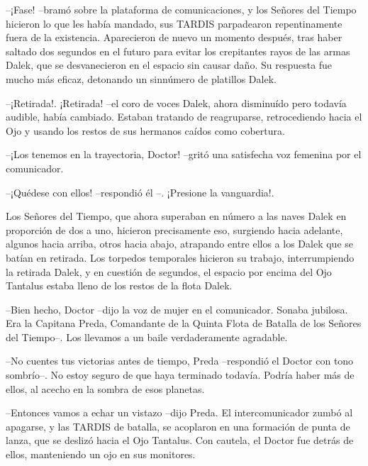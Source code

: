 --¡Fase! --bramó sobre la plataforma de comunicaciones, y los Señores del Tiempo hicieron lo que les había mandado, sus TARDIS parpadearon repentinamente fuera de la existencia. Aparecieron de nuevo un momento después, tras haber saltado dos segundos en el futuro para evitar los crepitantes rayos de las armas Dalek, que se desvanecieron en el espacio sin causar daño.
Su respuesta fue mucho más eficaz, detonando un sinnúmero de platillos Dalek.

--¡Retirada!. ¡Retirada! --el coro de voces Dalek, ahora disminuído pero todavía audible, había cambiado. Estaban tratando de reagruparse, retrocediendo hacia el Ojo y usando los restos de sus hermanos caídos como cobertura.

--¡Los tenemos en la trayectoria, Doctor! --gritó una satisfecha voz femenina por el comunicador.

--¡Quédese con ellos! --respondió él --. ¡Presione la vanguardia!.

Los Señores del Tiempo, que ahora superaban en número a las naves Dalek en proporción de dos a uno, hicieron precisamente eso, surgiendo hacia adelante, algunos hacia arriba, otros hacia abajo, atrapando entre ellos a los Dalek que se batían en retirada.
Los torpedos temporales hicieron su trabajo, interrumpiendo la retirada Dalek, y en cuestión de segundos, el espacio por encima del Ojo Tantalus estaba lleno de los restos de la flota Dalek. 

--Bien hecho, Doctor --dijo la voz de mujer en el comunicador. Sonaba jubilosa. Era la Capitana Preda, Comandante de la Quinta Flota de Batalla de los Señores del Tiempo--. Los llevamos a un baile verdaderamente agradable.

--No cuentes tus victorias antes de tiempo, Preda --respondió el Doctor con tono sombrío--. No estoy seguro de que haya terminado todavía. Podría haber más de ellos, al acecho en la sombra de esos planetas.

--Entonces vamos a echar un vistazo --dijo Preda. El intercomunicador zumbó al apagarse, y las TARDIS de batalla, se acoplaron en una formación de punta de lanza, que se deslizó hacia el Ojo Tantalus. Con cautela, el Doctor fue detrás de ellos, manteniendo un ojo en sus monitores.

